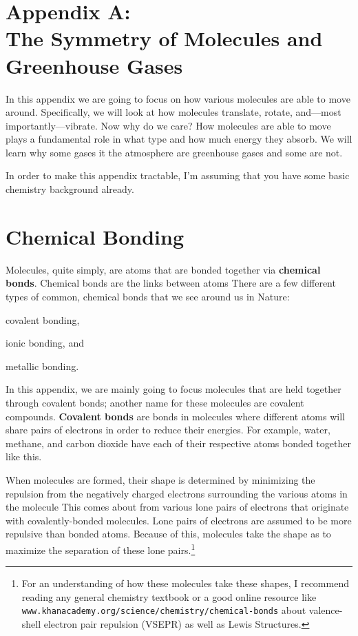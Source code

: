 

\newpage
\section*{\label{app:symmetry}{\LARGE{Appendix A:}}\\The Symmetry of Molecules and Greenhouse Gases}

    In this appendix we are going to focus on how various molecules are able to move around. Specifically, we will look at how molecules translate, rotate, and---most importantly---vibrate. Now why do we care? How molecules are able to move plays a fundamental role in what type and how much energy they absorb. We will learn why some gases it the atmosphere are greenhouse gases and some are not.

    In order to make this appendix tractable, I'm assuming that you have some basic chemistry background already.

    \section*{Chemical Bonding} %
    \label{sec:bonding}
            
    Molecules, quite simply, are atoms that are bonded together via \textbf{chemical bonds}. Chemical bonds are the links between atoms \citep{atkins2014physical} There are a few different types of common, chemical bonds that we see around us in Nature:
    \begin{enumerate*}[(1)]
        \item covalent bonding,
        \item ionic bonding, and
        \item metallic bonding.
    \end{enumerate*}
    In this appendix, we are mainly going to focus molecules that are held together through covalent bonds; another name for these molecules are covalent compounds. \textbf{Covalent bonds} are bonds in molecules where different atoms will share pairs of electrons in order to reduce their energies. For example, water, methane, and carbon dioxide have each of their respective atoms bonded together like this.

    When molecules are formed, their shape is determined by minimizing the repulsion from the negatively charged electrons surrounding the various atoms in the molecule \citep{atkins2014physical} This comes about from various lone pairs of electrons that originate with covalently-bonded molecules. Lone pairs of electrons are assumed to be more repulsive than bonded atoms. Because of this, molecules take the shape as to maximize the separation of these lone pairs.\footnote{For an understanding of how these molecules take these shapes, I recommend reading any general chemistry textbook or a good online resource like \texttt{www.khanacademy.org/science/chemistry/chemical-bonds} about valence-shell electron pair repulsion (VSEPR) as well as Lewis Structures.} 

